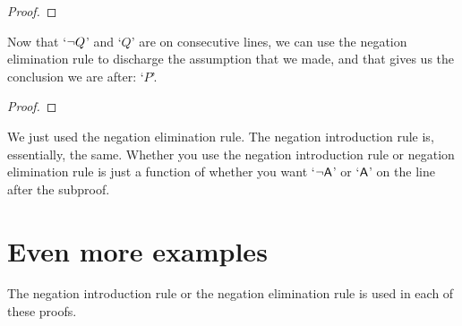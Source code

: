 \begin{proof}
	 \pr{}	
	 \pr{}
	\open
		\as{}
\end{proof}
Now that `${\neg} Q$' and `$Q$' are on consecutive lines, we can use the negation elimination rule to discharge the assumption that we made, and that gives us the conclusion we are after: `$P$'.

\begin{proof}
	 \pr{}	
	 \pr{}
	\open
		\as{}
	\close
\end{proof}

We just used the negation elimination rule. The negation introduction rule is, essentially, the same. Whether you use the negation introduction rule or negation elimination rule is just a function of whether you want `${\neg} \mathsf{A}$' or `$\mathsf{A}$' on the line after the subproof.



\section{Even more examples}

The negation introduction rule or the negation elimination rule is used in each of these proofs.

